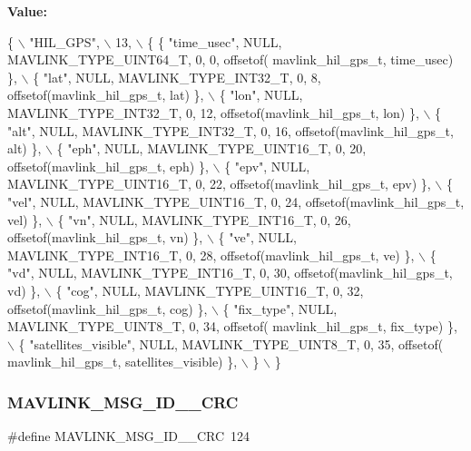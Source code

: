 {\bfseries Value\+:}
\begin{DoxyCode}
\{ \(\backslash\)
    \textcolor{stringliteral}{"HIL\_GPS"}, \(\backslash\)
    13, \(\backslash\)
    \{  \{ \textcolor{stringliteral}{"time\_usec"}, NULL, MAVLINK_TYPE_UINT64_T, 0, 0, offsetof(
      mavlink_hil_gps_t, time\_usec) \}, \(\backslash\)
         \{ \textcolor{stringliteral}{"lat"}, NULL, MAVLINK_TYPE_INT32_T, 0, 8, offsetof(mavlink_hil_gps_t, lat) \}, \(\backslash\)
         \{ \textcolor{stringliteral}{"lon"}, NULL, MAVLINK_TYPE_INT32_T, 0, 12, offsetof(mavlink_hil_gps_t, lon) \}, \(\backslash\)
         \{ \textcolor{stringliteral}{"alt"}, NULL, MAVLINK_TYPE_INT32_T, 0, 16, offsetof(mavlink_hil_gps_t, alt) \}, \(\backslash\)
         \{ \textcolor{stringliteral}{"eph"}, NULL, MAVLINK_TYPE_UINT16_T, 0, 20, offsetof(mavlink_hil_gps_t, eph) \}, \(\backslash\)
         \{ \textcolor{stringliteral}{"epv"}, NULL, MAVLINK_TYPE_UINT16_T, 0, 22, offsetof(mavlink_hil_gps_t, epv) \}, \(\backslash\)
         \{ \textcolor{stringliteral}{"vel"}, NULL, MAVLINK_TYPE_UINT16_T, 0, 24, offsetof(mavlink_hil_gps_t, vel) \}, \(\backslash\)
         \{ \textcolor{stringliteral}{"vn"}, NULL, MAVLINK_TYPE_INT16_T, 0, 26, offsetof(mavlink_hil_gps_t, vn) \}, \(\backslash\)
         \{ \textcolor{stringliteral}{"ve"}, NULL, MAVLINK_TYPE_INT16_T, 0, 28, offsetof(mavlink_hil_gps_t, ve) \}, \(\backslash\)
         \{ \textcolor{stringliteral}{"vd"}, NULL, MAVLINK_TYPE_INT16_T, 0, 30, offsetof(mavlink_hil_gps_t, vd) \}, \(\backslash\)
         \{ \textcolor{stringliteral}{"cog"}, NULL, MAVLINK_TYPE_UINT16_T, 0, 32, offsetof(mavlink_hil_gps_t, cog) \}, \(\backslash\)
         \{ \textcolor{stringliteral}{"fix\_type"}, NULL, MAVLINK_TYPE_UINT8_T, 0, 34, offsetof(
      mavlink_hil_gps_t, fix\_type) \}, \(\backslash\)
         \{ \textcolor{stringliteral}{"satellites\_visible"}, NULL, MAVLINK_TYPE_UINT8_T, 0, 35, offsetof(
      mavlink_hil_gps_t, satellites\_visible) \}, \(\backslash\)
         \} \(\backslash\)
\}
\end{DoxyCode}
\mbox{\label{mavlink__msg__hil__gps_8h_a940129ab6433a486ea41f183134675a2}} 
\subsubsection{M\+A\+V\+L\+I\+N\+K\+\_\+\+M\+S\+G\+\_\+\+I\+D\+\_\+\_\+\+C\+RC}
{\footnotesize\ttfamily \#define M\+A\+V\+L\+I\+N\+K\+\_\+\+M\+S\+G\+\_\+\+I\+D\+\_\+\_\+\+C\+RC~124}


